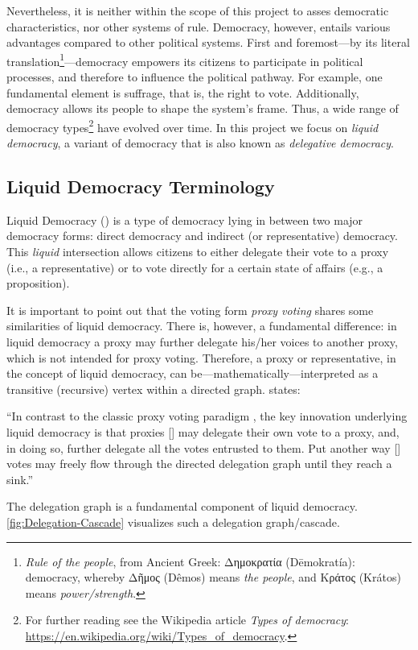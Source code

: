 Nevertheless, it is neither within the scope of this project to asses democratic characteristics, nor other systems of rule. Democracy, however, entails various advantages compared to other political systems. First and foremost---by its literal translation\footnote{\textit{Rule of the people}, from Ancient Greek: \textgreek{Δημοκρατία} (Dēmokratía): democracy, whereby \textgreek{Δῆμος} (Dêmos) means \textit{the people}, and \textgreek{Κράτος} (Krátos) means \textit{power/strength}.}---democracy empowers its citizens to participate in political processes, and therefore to influence the political pathway. For example, one fundamental element is suffrage, that is, the right to vote. Additionally, democracy allows its people to shape the system’s frame. Thus, a wide range of democracy types\footnote{For further reading see the Wikipedia article \textit{Types of democracy}: \url{https://en.wikipedia.org/wiki/Types_of_democracy}.} have evolved over time. In this project we focus on \textit{liquid democracy}, a variant of democracy that is also known as \textit{delegative democracy}.


\subsection{Liquid Democracy Terminology}
\label{ssec:Liquid_Democracy}

Liquid Democracy () is a type of democracy lying in between two major democracy forms: direct democracy and indirect (or representative) democracy. This \textit{liquid} intersection allows citizens to either delegate their vote to a proxy (i.e., a representative) or to vote directly for a certain state of affairs (e.g., a proposition).

It is important to point out that the voting form \textit{proxy voting} shares some similarities of liquid democracy. There is, however, a fundamental difference: in liquid democracy a proxy may further delegate his/her voices to another proxy, which is not intended for proxy voting. Therefore, a proxy or representative, in the concept of liquid democracy, can be---mathematically---interpreted as a transitive (recursive) vertex within a directed graph. \citeauthor{Kahng2018} states:

\begin{displayquote}
“In contrast to the classic proxy voting paradigm \parencite{Miller1969}, the key innovation underlying liquid democracy is that proxies [\textellipsis] may delegate their own vote to a proxy, and, in doing so, further delegate all the votes entrusted to them. Put another way [\textellipsis] votes may freely flow through the directed delegation graph until they reach a sink.”\\[1mm]
\hspace*{\fill}\textcite{Kahng2018}
\end{displayquote}
The delegation graph is a fundamental component of liquid democracy. \autoref{fig:Delegation-Cascade} visualizes such a delegation graph/cascade. 

